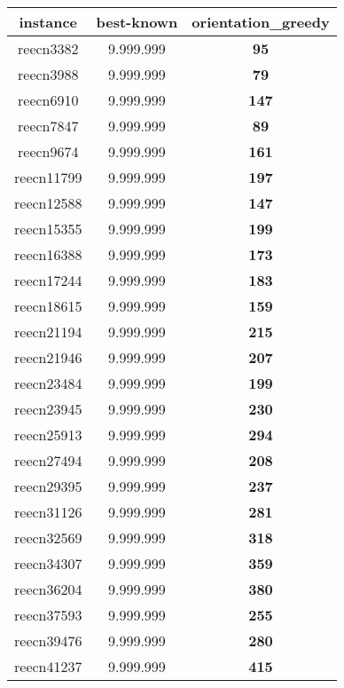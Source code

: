 \begin{tabular}{cc||c}
instance & best-known & orientation\_greedy \\ 
 \hline 
reecn3382        & 9.999.999        & {\bf 95}        \\ 
reecn3988        & 9.999.999        & {\bf 79}        \\ 
reecn6910        & 9.999.999        & {\bf 147}       \\ 
reecn7847        & 9.999.999        & {\bf 89}        \\ 
reecn9674        & 9.999.999        & {\bf 161}       \\ 
reecn11799       & 9.999.999        & {\bf 197}       \\ 
reecn12588       & 9.999.999        & {\bf 147}       \\ 
reecn15355       & 9.999.999        & {\bf 199}       \\ 
reecn16388       & 9.999.999        & {\bf 173}       \\ 
reecn17244       & 9.999.999        & {\bf 183}       \\ 
reecn18615       & 9.999.999        & {\bf 159}       \\ 
reecn21194       & 9.999.999        & {\bf 215}       \\ 
reecn21946       & 9.999.999        & {\bf 207}       \\ 
reecn23484       & 9.999.999        & {\bf 199}       \\ 
reecn23945       & 9.999.999        & {\bf 230}       \\ 
reecn25913       & 9.999.999        & {\bf 294}       \\ 
reecn27494       & 9.999.999        & {\bf 208}       \\ 
reecn29395       & 9.999.999        & {\bf 237}       \\ 
reecn31126       & 9.999.999        & {\bf 281}       \\ 
reecn32569       & 9.999.999        & {\bf 318}       \\ 
reecn34307       & 9.999.999        & {\bf 359}       \\ 
reecn36204       & 9.999.999        & {\bf 380}       \\ 
reecn37593       & 9.999.999        & {\bf 255}       \\ 
reecn39476       & 9.999.999        & {\bf 280}       \\ 
reecn41237       & 9.999.999        & {\bf 415}       \\ 

\end{tabular}
